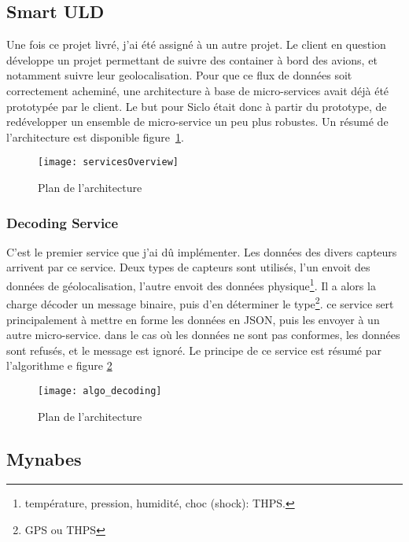 \documentclass[../rapport.tex]{subfiles}
\begin{document}
        \subsection{Smart ULD}
        Une fois ce projet livré, j'ai été assigné à un autre projet.
        Le client en question développe un projet permettant de suivre des container
        à bord des avions, et notamment suivre leur geolocalisation.
        Pour que ce flux de données soit correctement acheminé, une architecture à base de micro-services
        avait déjà été prototypée par le client. Le but pour Siclo était donc à
        partir du prototype, de 
        redévelopper un ensemble de micro-service un peu plus robustes. Un
        résumé de l'architecture est disponible figure~\ref{fig:overview}.

        \begin{figure}
            \centering
            \texttt{[image: servicesOverview]}
            \caption{Plan de l'architecture}
            \label{fig:overview}
        \end{figure}

        \subsubsection{Decoding Service}
        C'est le premier service que j'ai dû implémenter. 
        Les données des divers capteurs arrivent par ce service. Deux types de capteurs sont utilisés, l'un envoit des données de géolocalisation, l'autre envoit des données physique\footnote{température, pression, humidité, choc (shock): THPS.}. Il a alors la charge décoder un message binaire, puis d'en déterminer le type\footnote{GPS ou THPS}. ce service sert principalement à mettre en forme les données en \gls{JSON}, puis les envoyer à un autre micro-service. dans le cas où les données ne sont pas conformes, les données sont refusés, et le message est ignoré.
        Le principe de ce service est résumé par l'algorithme e figure \ref{fig:algo_decoding}

        \begin{figure}
            \centering
            \texttt{[image: algo\_decoding]}
            \caption{Plan de l'architecture}
            \label{fig:algo_decoding}
        \end{figure}

        \subsection{Mynabes}\label{subsec:mynabes}
\end{document}
